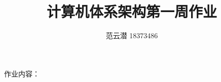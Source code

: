 \documentclass[lang=cn,11pt,a4paper,cite=authoryear]{elegantpaper}
\title{计算机体系架构\quad 第一周作业}
\author{范云潜 18373486}
\institute{微电子学院 184111 班}
\date{\zhtoday}
\begin{document}
\maketitle

作业内容：

\tableofcontents


\end{document}
